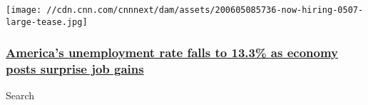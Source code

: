 \begin{itemize}
  \texttt{[image: //cdn.cnn.com/cnnnext/dam/assets/200605085736-now-hiring-0507-large-tease.jpg]}

  \hypertarget{americas-unemployment-rate-falls-to-133-as-economy-posts-surprise-job-gains}{%
  \subsubsection{\texorpdfstring{\href{/2020/06/05/economy/may-jobs-report-2020-coronavirus/index.html}{America's
  unemployment rate falls to 13.3\% as economy posts surprise job
  gains}}{America's unemployment rate falls to 13.3\% as economy posts surprise job gains}}\label{americas-unemployment-rate-falls-to-133-as-economy-posts-surprise-job-gains}}
\end{itemize}

Search

